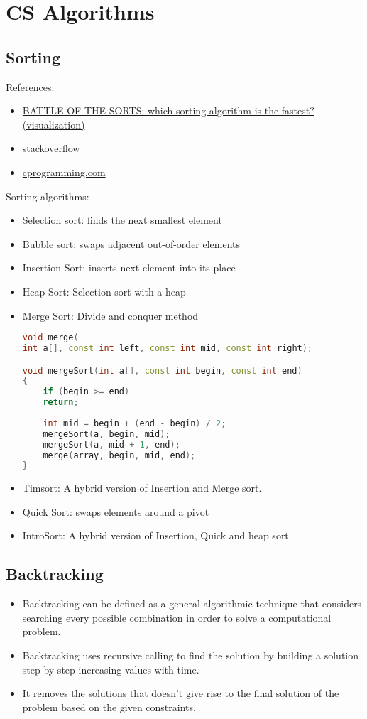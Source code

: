 \chapter{CS Algorithms}

\section{Sorting}

References:
\begin{itemize}
	\item \href{https://youtu.be/OOBBI-kSChM}{BATTLE OF THE SORTS: which sorting algorithm is the fastest? (visualization)}
	\item \href{https://stackoverflow.com/q/5038895/11397588}{stackoverflow}
	\item \href{https://www.cprogramming.com/tutorial/computersciencetheory/sortcomp.html}{cprogramming.com}
\end{itemize}

Sorting algorithms:
\begin{itemize}
	\item Selection sort: finds the next smallest element
	\item Bubble sort: swaps adjacent out-of-order elements
	\item Insertion Sort: inserts next element into its place
	\item Heap Sort: Selection sort with a heap
	\item Merge Sort: Divide and conquer method
\begin{lstlisting}[language=C++]
void merge(
int a[], const int left, const int mid, const int right);	

void mergeSort(int a[], const int begin, const int end)
{
	if (begin >= end)
	return;
	
	int mid = begin + (end - begin) / 2;
	mergeSort(a, begin, mid);
	mergeSort(a, mid + 1, end);
	merge(array, begin, mid, end);
}
\end{lstlisting}
	\item Timsort: A hybrid version of Insertion and Merge sort.
	\item Quick Sort: swaps elements around a pivot
	\item IntroSort: A hybrid version of Insertion, Quick and heap sort
\end{itemize}

\section{Backtracking}
\begin{itemize}
	\item Backtracking can be defined as a general algorithmic technique that considers searching every possible combination in order to solve a computational problem.
	\item Backtracking uses recursive calling to find the solution by building a solution step by step increasing values with time.
	\item It removes the solutions that doesn't give rise to the final solution of the problem based on the given constraints.
\end{itemize}

